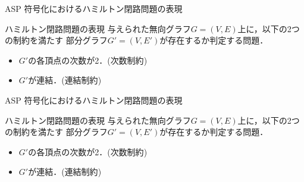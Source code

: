 \documentclass[dvipdfmx,10pt]{beamer}
\begin{document}
\begin{frame}{ASP 符号化におけるハミルトン閉路問題の表現}
  \begin{block}{ハミルトン閉路問題の表現}
    与えられた無向グラフ$G= (V,E)$上に，以下の2つの制約を満たす
    部分グラフ$G'= (V,E')$が存在するか判定する問題．
    \begin{itemize}
    \item $G'$の各頂点の次数が2．(\alert{次数制約})
    \item $G'$が連結．(\alert{連結制約})
    \end{itemize}
  \end{block}
  \begin{multicols}{2}
   \pause
   \begin{center}
    
   \end{center}
   \begin{center}
   \end{center}
  \end{multicols}
\end{frame}

\begin{frame}[noframenumbering]{ASP 符号化におけるハミルトン閉路問題の表現}
  \begin{block}{ハミルトン閉路問題の表現}
    与えられた無向グラフ$G= (V,E)$上に，以下の2つの制約を満たす
    部分グラフ$G'= (V,E')$が存在するか判定する問題．
    \begin{itemize}
    \item $G'$の各頂点の次数が2．(\alert{次数制約})
    \item $G'$が連結．(\alert{連結制約})
    \end{itemize}
  \end{block}
  \begin{multicols}{2}
   \begin{center}
    
   \end{center}
   \begin{center}
    
   \end{center}
  \end{multicols}
\end{frame}
\end{document}
